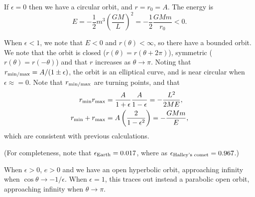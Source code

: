 \documentclass[letter-paper]{tufte-book}
\begin{document}
If $\epsilon = 0$ then we have a circular orbit, and $r = r_0 = A$. The energy
is
\begin{equation*}
  E = -\frac{1}{2}m^3 \left(\frac{GM}{L}\right)^2 = -\frac{1}{2}\frac{GMm}{r_0} < 0.
\end{equation*}

When $\epsilon < 1$, we note that $E < 0$ and $r(\theta) < \infty$, so there
have a bounded orbit. We note that the orbit is closed ($r(\theta) = r(\theta +
2\pi)$), symmetric ($r(\theta) = r(-\theta)$) and that $r$ increases as $\theta
\to \pi$. Noting that $r_{\rm min/max} = A / (1 \pm \epsilon)$, the orbit is an
elliptical curve, and is near circular when $\epsilon \approx = 0$. Note that
$r_{\rm min/max}$ are turning points, and that
\begin{align*}
  r_{\rm min} r_{\rm max} &= \frac{A}{1 + \epsilon} \frac{A}{1 - \epsilon} = -\frac{L^2}{2ME},\\
  r_{\rm min} + r_{\rm max} &= A\left(\frac{2}{1 - \epsilon^2} \right) = -\frac{GMm}{E},
\end{align*}
which are consistent with previous calculations.

(For completeness, note that $\epsilon_{\rm Earth} = 0.017$, where as
$\epsilon_{\textnormal{Halley's comet}} = 0.967$.)

When $\epsilon > 0$, $e > 0$ and we have an open hyperbolic orbit, approaching
infinity when $\cos \theta \to -1/\epsilon$. When $\epsilon = 1$, this traces
out instead a parabolic open orbit, approaching infinity when $\theta \to \pi$.
\end{document}
